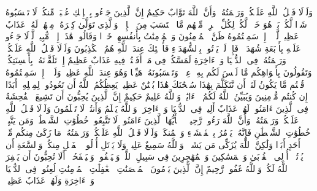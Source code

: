 \startbuffer[\q:24:10]
وَلَوۡلَا فَضۡلُ ٱللَّهِ عَلَیۡكُمۡ وَرَحۡمَتُهُۥ وَأَنَّ ٱللَّهَ تَوَّابٌ حَكِیمٌ%
\stopbuffer
\startbuffer[\q:24:11]
إِنَّ ٱلَّذِینَ جَاۤءُو بِٱلۡإِفۡكِ عُصۡبَةࣱ مِّنكُمۡۚ لَا تَحۡسَبُوهُ شَرࣰّا لَّكُمۖ بَلۡ هُوَ خَیۡرࣱ لَّكُمۡۚ لِكُلِّ ٱمۡرِئࣲ مِّنۡهُم مَّا ٱكۡتَسَبَ مِنَ ٱلۡإِثۡمِۚ وَٱلَّذِی تَوَلَّىٰ كِبۡرَهُۥ مِنۡهُمۡ لَهُۥ عَذَابٌ عَظِیمࣱ%
\stopbuffer
\startbuffer[\q:24:12]
لَّوۡلَاۤ إِذۡ سَمِعۡتُمُوهُ ظَنَّ ٱلۡمُؤۡمِنُونَ وَٱلۡمُؤۡمِنَٰتُ بِأَنفُسِهِمۡ خَیۡرࣰا وَقَالُوا۟ هَٰذَاۤ إِفۡكࣱ مُّبِینࣱ%
\stopbuffer
\startbuffer[\q:24:13]
لَّوۡلَا جَاۤءُو عَلَیۡهِ بِأَرۡبَعَةِ شُهَدَاۤءَۚ فَإِذۡ لَمۡ یَأۡتُوا۟ بِٱلشُّهَدَاۤءِ فَأُو۟لَٰۤئِكَ عِندَ ٱللَّهِ هُمُ ٱلۡكَٰذِبُونَ%
\stopbuffer
\startbuffer[\q:24:14]
وَلَوۡلَا فَضۡلُ ٱللَّهِ عَلَیۡكُمۡ وَرَحۡمَتُهُۥ فِی ٱلدُّنۡیَا وَٱلۡءَاخِرَةِ لَمَسَّكُمۡ فِی مَاۤ أَفَضۡتُمۡ فِیهِ عَذَابٌ عَظِیمٌ%
\stopbuffer
\startbuffer[\q:24:15]
إِذۡ تَلَقَّوۡنَهُۥ بِأَلۡسِنَتِكُمۡ وَتَقُولُونَ بِأَفۡوَاهِكُم مَّا لَیۡسَ لَكُم بِهِۦ عِلۡمࣱ وَتَحۡسَبُونَهُۥ هَیِّنࣰا وَهُوَ عِندَ ٱللَّهِ عَظِیمࣱ%
\stopbuffer
\startbuffer[\q:24:16]
وَلَوۡلَاۤ إِذۡ سَمِعۡتُمُوهُ قُلۡتُم مَّا یَكُونُ لَنَاۤ أَن نَّتَكَلَّمَ بِهَٰذَا سُبۡحَٰنَكَ هَٰذَا بُهۡتَٰنٌ عَظِیمࣱ%
\stopbuffer
\startbuffer[\q:24:17]
یَعِظُكُمُ ٱللَّهُ أَن تَعُودُوا۟ لِمِثۡلِهِۦۤ أَبَدًا إِن كُنتُم مُّؤۡمِنِینَ%
\stopbuffer
\startbuffer[\q:24:18]
وَیُبَیِّنُ ٱللَّهُ لَكُمُ ٱلۡءَایَٰتِۚ وَٱللَّهُ عَلِیمٌ حَكِیمٌ%
\stopbuffer
\startbuffer[\q:24:19]
إِنَّ ٱلَّذِینَ یُحِبُّونَ أَن تَشِیعَ ٱلۡفَٰحِشَةُ فِی ٱلَّذِینَ ءَامَنُوا۟ لَهُمۡ عَذَابٌ أَلِیمࣱ فِی ٱلدُّنۡیَا وَٱلۡءَاخِرَةِۚ وَٱللَّهُ یَعۡلَمُ وَأَنتُمۡ لَا تَعۡلَمُونَ%
\stopbuffer
\startbuffer[\q:24:20]
وَلَوۡلَا فَضۡلُ ٱللَّهِ عَلَیۡكُمۡ وَرَحۡمَتُهُۥ وَأَنَّ ٱللَّهَ رَءُوفࣱ رَّحِیمࣱ%
\stopbuffer
\startbuffer[\q:24:21]
۞ یَٰۤأَیُّهَا ٱلَّذِینَ ءَامَنُوا۟ لَا تَتَّبِعُوا۟ خُطُوَٰتِ ٱلشَّیۡطَٰنِۚ وَمَن یَتَّبِعۡ خُطُوَٰتِ ٱلشَّیۡطَٰنِ فَإِنَّهُۥ یَأۡمُرُ بِٱلۡفَحۡشَاۤءِ وَٱلۡمُنكَرِۚ وَلَوۡلَا فَضۡلُ ٱللَّهِ عَلَیۡكُمۡ وَرَحۡمَتُهُۥ مَا زَكَىٰ مِنكُم مِّنۡ أَحَدٍ أَبَدࣰا وَلَٰكِنَّ ٱللَّهَ یُزَكِّی مَن یَشَاۤءُۗ وَٱللَّهُ سَمِیعٌ عَلِیمࣱ%
\stopbuffer
\startbuffer[\q:24:22]
وَلَا یَأۡتَلِ أُو۟لُوا۟ ٱلۡفَضۡلِ مِنكُمۡ وَٱلسَّعَةِ أَن یُؤۡتُوۤا۟ أُو۟لِی ٱلۡقُرۡبَىٰ وَٱلۡمَسَٰكِینَ وَٱلۡمُهَٰجِرِینَ فِی سَبِیلِ ٱللَّهِۖ وَلۡیَعۡفُوا۟ وَلۡیَصۡفَحُوۤا۟ۗ أَلَا تُحِبُّونَ أَن یَغۡفِرَ ٱللَّهُ لَكُمۡۚ وَٱللَّهُ غَفُورࣱ رَّحِیمٌ%
\stopbuffer
\startbuffer[\q:24:23]
إِنَّ ٱلَّذِینَ یَرۡمُونَ ٱلۡمُحۡصَنَٰتِ ٱلۡغَٰفِلَٰتِ ٱلۡمُؤۡمِنَٰتِ لُعِنُوا۟ فِی ٱلدُّنۡیَا وَٱلۡءَاخِرَةِ وَلَهُمۡ عَذَابٌ عَظِیمࣱ%
\stopbuffer
\startbuffer[\q:24:24]
